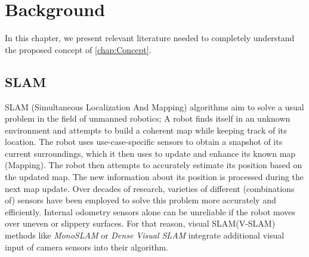 \documentclass[main.tex]{subfiles}
\begin{document}
\chapter{Background}\label{chap:Background}
In this chapter, we present relevant literature needed to completely understand the proposed concept of \autoref{chap:Concept}.

\section{SLAM}
SLAM (Simultaneous Localization And Mapping) algorithms aim to solve a usual problem in the field of unmanned robotics;
A robot finds itself in an unknown environment and attempts to build a coherent map while keeping track of its location.
The robot uses use-case-specific sensors to obtain a snapshot of its current surroundings, which it then uses to update and enhance its known map (Mapping).
The robot then attempts to accurately estimate its position based on the updated map. The new information about its position is processed during the next map update.
Over decades of research, varieties of different (combinations of) sensors have been employed to solve this problem more accurately and efficiently.
Internal odometry sensors alone can be unreliable if the robot moves over uneven or slippery surfaces. For that reason, visual SLAM(V-SLAM) methods like \textit{MonoSLAM}\cite{1238654} or
\textit{Dense Visual SLAM}\cite{Kerl_Sturm_Cremers_2013} integrate additional visual input of camera sensors into their algorithm.
\end{document}
